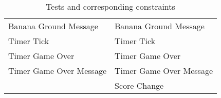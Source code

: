 \begin{table}
\begin{tabular}{ll}
        Banana Ground Message          & Banana Ground Message\\
        Timer Tick                     & Timer Tick\\
        Timer Game Over                & Timer Game Over\\
        Timer Game Over Message        & Timer Game Over Message\\
                                       & Score Change\\
        \bottomrule
    \end{tabular}
    \caption{Tests and corresponding constraints}
    \label{tab:tests_and_corresponding_constraints}
\end{table}


































